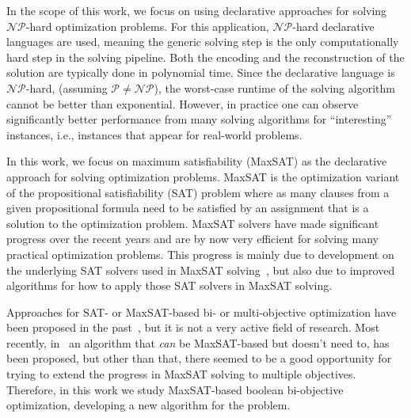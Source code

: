 In the scope of this work, we focus on using declarative approaches for solving $\mathcal{NP}$-hard optimization problems.
For this application, $\mathcal{NP}$-hard declarative languages are used, meaning the generic solving step is the only computationally hard step in the solving pipeline.
Both the encoding and the reconstruction of the solution are typically done in polynomial time.
Since the declarative language is $\mathcal{NP}$-hard, (assuming $\mathcal{P}\neq\mathcal{NP}$), the worst-case runtime of the solving algorithm cannot be better than exponential.
However, in practice one can observe significantly better performance from many solving algorithms for ``interesting'' instances, i.e., instances that appear for real-world problems.

In this work, we focus on maximum satisfiability (MaxSAT) as the declarative approach for solving optimization problems.
MaxSAT is the optimization variant of the propositional satisfiability (SAT) problem where as many clauses from a given propositional formula need to be satisfied by an assignment that is a solution to the optimization problem.
MaxSAT solvers have made significant progress over the recent years and are by now very efficient for solving many practical optimization problems.
This progress is mainly due to development on the underlying SAT solvers used in MaxSAT solving~\autocite{}, but also due to improved algorithms for how to apply those SAT solvers in MaxSAT solving.

Approaches for SAT- or MaxSAT-based bi- or multi-objective optimization have been proposed in the past~\autocite{DBLP:conf/cp/SohBTB17,DBLP:conf/ijcai/Terra-NevesLM18a,DBLP:conf/aaai/Terra-NevesLM18,DBLP:conf/ijcai/Terra-NevesLM18}, but it is not a very active field of research.
Most recently, in~\textcite{DBLP:conf/cp/JanotaMSM21} an algorithm that \emph{can} be MaxSAT-based but doesn't need to, has been proposed, but other than that, there seemed to be a good opportunity for trying to extend the progress in MaxSAT solving to multiple objectives.
Therefore, in this work we study MaxSAT-based boolean bi-objective optimization, developing a new algorithm for the problem.

